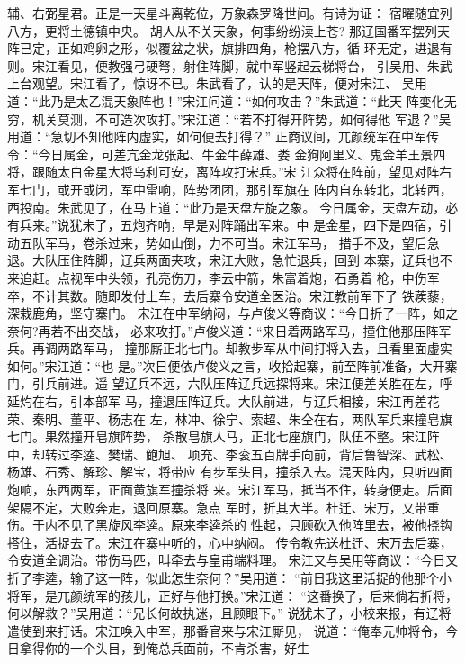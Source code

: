 辅、右弼星君。正是一天星斗离乾位，万象森罗降世间。有诗为证：
宿曜随宜列八方，更将土德镇中央。
胡人从不关天象，何事纷纷渎上苍?
那辽国番军摆列天阵已定，正如鸡卵之形，似覆盆之状，旗排四角，枪摆八方，循
环无定，进退有则。宋江看见，便教强弓硬弩，射住阵脚，就中军竖起云梯将台，
引吴用、朱武上台观望。宋江看了，惊讶不已。朱武看了，认的是天阵，便对宋江、
吴用道：“此乃是太乙混天象阵也！”宋江问道：“如何攻击？”朱武道：“此天
阵变化无穷，机关莫测，不可造次攻打。”宋江道：“若不打得开阵势，如何得他
军退？”吴用道：“急切不知他阵内虚实，如何便去打得？”
正商议间，兀颜统军在中军传令：“今日属金，可差亢金龙张起、牛金牛薛雄、娄
金狗阿里义、鬼金羊王景四将，跟随太白金星大将乌利可安，离阵攻打宋兵。”宋
江众将在阵前，望见对阵右军七门，或开或闭，军中雷响，阵势团团，那引军旗在
阵内自东转北，北转西，西投南。朱武见了，在马上道：“此乃是天盘左旋之象。
今日属金，天盘左动，必有兵来。”说犹未了，五炮齐响，早是对阵踊出军来。中
是金星，四下是四宿，引动五队军马，卷杀过来，势如山倒，力不可当。宋江军马，
措手不及，望后急退。大队压住阵脚，辽兵两面夹攻，宋江大败，急忙退兵，回到
本寨，辽兵也不来追赶。点视军中头领，孔亮伤刀，李云中箭，朱富着炮，石勇着
枪，中伤军卒，不计其数。随即发付上车，去后寨令安道全医治。宋江教前军下了
铁蒺藜，深栽鹿角，坚守寨门。
宋江在中军纳闷，与卢俊义等商议：“今日折了一阵，如之奈何?再若不出交战，
必来攻打。”卢俊义道：“来日着两路军马，撞住他那压阵军兵。再调两路军马，
撞那厮正北七门。却教步军从中间打将入去，且看里面虚实如何。”宋江道：“也
是。”次日便依卢俊义之言，收拾起寨，前至阵前准备，大开寨门，引兵前进。遥
望辽兵不远，六队压阵辽兵远探将来。宋江便差关胜在左，呼延灼在右，引本部军
马，撞退压阵辽兵。大队前进，与辽兵相接，宋江再差花荣、秦明、董平、杨志在
左，林冲、徐宁、索超、朱仝在右，两队军兵来撞皂旗七门。果然撞开皂旗阵势，
杀散皂旗人马，正北七座旗门，队伍不整。宋江阵中，却转过李逵、樊瑞、鲍旭、
项充、李衮五百牌手向前，背后鲁智深、武松、杨雄、石秀、解珍、解宝，将带应
有步军头目，撞杀入去。混天阵内，只听四面炮响，东西两军，正面黄旗军撞杀将
来。宋江军马，抵当不住，转身便走。后面架隔不定，大败奔走，退回原寨。急点
军时，折其大半。杜迁、宋万，又带重伤。于内不见了黑旋风李逵。原来李逵杀的
性起，只顾砍入他阵里去，被他挠钩搭住，活捉去了。宋江在寨中听的，心中纳闷。
传令教先送杜迁、宋万去后寨，令安道全调治。带伤马匹，叫牵去与皇甫端料理。
宋江又与吴用等商议：“今日又折了李逵，输了这一阵，似此怎生奈何？”吴用道：
“前日我这里活捉的他那个小将军，是兀颜统军的孩儿，正好与他打换。”宋江道：
“这番换了，后来倘若折将，何以解救？”吴用道：“兄长何故执迷，且顾眼下。”
说犹未了，小校来报，有辽将遣使到来打话。宋江唤入中军，那番官来与宋江厮见，
说道：“俺奉元帅将令，今日拿得你的一个头目，到俺总兵面前，不肯杀害，好生
